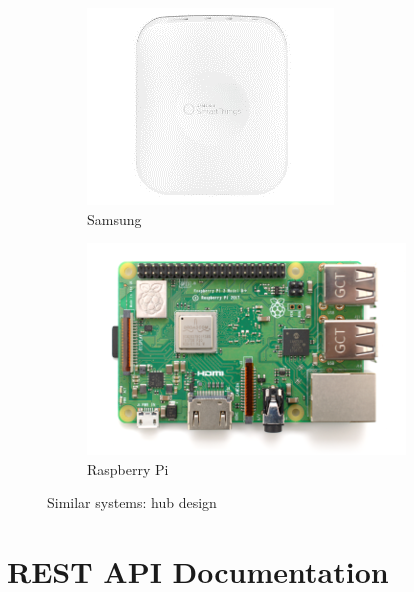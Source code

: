 \documentclass[12pt, oneside, a4paper]{book}
\begin{document}
\begin{figure}[H]
\begin{subfigure}[b]{.5\linewidth}
			\includegraphics[width=\linewidth]{img/samsung_hw.png}
				\caption{Samsung}
			\end{subfigure}
			\begin{subfigure}[b]{.5\linewidth}
				\includegraphics[width=\linewidth]{img/raspberry.png}
				\caption{Raspberry Pi}
			\end{subfigure}
			\caption{Similar systems: hub design}
		\end{figure}

		\newpage\chapter{REST API Documentation}
		\label{appendix:api_doc}
		
\end{document}
